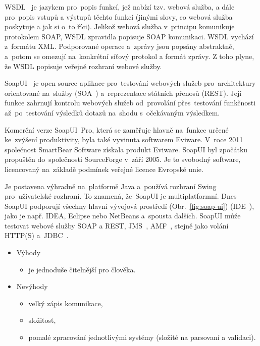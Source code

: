 WSDL~\cite{wsdl} je jazykem pro~popis funkcí, jež nabízí tzv. webová služba, a dále pro~popis vstupů a výstupů těchto funkcí (jinými slovy, co webová služba poskytuje a jak si o~to říci). Jelikož webová služba v~principu komunikuje protokolem SOAP, WSDL zpravidla popisuje SOAP komunikaci. WSDL vychází z~formátu XML. Podporované operace a~zprávy jsou popsány abstraktně, a~potom se omezují na~konkrétní síťový protokol a formát zprávy. Z toho plyne, že WSDL popisuje veřejné rozhraní webové služby.

SoapUI~\cite{soapui} je open source aplikace pro~testování webových služeb pro~architektury orientované na~služby (SOA~\cite{soa}) a~reprezentace státních přenosů (REST). Její funkce zahrnují kontrolu webových služeb od~provolání přes~testování funkčnosti až~po~testování výsledků dotazů na~shodu s~očekávaným výsledkem.

Komerční verze SoapUI~Pro, která se zaměřuje hlavně na~funkce určené ke~zvýšení produktivity, byla také vyvinuta softwarem Eviware. V~roce 2011 společnost SmartBear Software získala produkt Eviware. SoapUI byl zpočátku propuštěn do~společnosti SourceForge v~září 2005. Je to svobodný software, licencovaný na~základě podmínek veřejné licence Evropské unie. 

Je postavena výhradně na~platformě Java a~používá rozhraní Swing pro~uživatelské rozhraní. To znamená, že~SoapUI je multiplatformní. Dnes SoapUI podporují všechny hlavní vývojová prostředí (Obr.~\ref{fig:soap-ui}) (IDE~\cite{ide}), jako je např. IDEA, Eclipse nebo NetBeans a~spousta dalších. SoapUI může testovat webové služby SOAP a REST, JMS~\cite{jms}, AMF~\cite{amf}, stejně jako volání HTTP(S) a~JDBC~\cite{jdbc}.


\begin{itemize}
	\setlength{\parskip}{0pt}
	\setlength{\itemsep}{0pt}
	\item {Výhody}
	\begin{itemize}
		\setlength{\parskip}{0pt}
		\setlength{\itemsep}{0pt}
		\item {je jednoduše čitelnější pro člověka.}
	\end{itemize}	
	
	\item {Nevýhody}
	\begin{itemize}
		\setlength{\parskip}{0pt}
		\setlength{\itemsep}{0pt}
		\item {velký zápis komunikace,}
		\item {složitost,}
		\item {pomalé zpracování jednotlivými systémy (složité na parsovaní a validaci).}
	\end{itemize}
\end{itemize}

